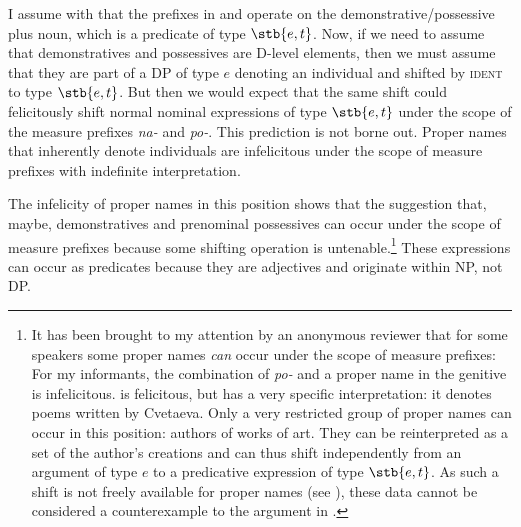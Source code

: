 \documentclass[output=paper]{langscibook}
\begin{document}
I assume with \citet{Filip2005} that the prefixes in  and  operate on the demonstrative/possessive plus noun, which is a predicate of type $\stb{e,t}$. Now, if we need to assume that demonstratives and possessives are D-level elements, then we must assume that they are part of a DP of type $e$ denoting an individual and shifted by \textsc{ident} to type $\stb{e,t}$. But then we would expect that the same shift could felicitously shift normal nominal expressions of type $\stb{e,t}$ under the scope of the measure prefixes \textit{na-} and \textit{po-}. This prediction is not borne out. Proper names that inherently denote individuals are infelicitous under the scope of measure prefixes with indefinite interpretation.


\ea\label{nasmotret} 
\z\z 

\noindent The infelicity of proper names in this position shows that the suggestion that, maybe, demonstratives and prenominal possessives can occur under the scope of measure prefixes because some shifting operation is untenable.\footnote{It has been brought to my attention by an anonymous reviewer that for some speakers some proper names \emph{can} occur under the scope of measure prefixes:
\ea
\z\z 
\noindent For my informants, the combination of \textit{po-} and a proper name in the genitive is infelicitous.  is felicitous, but has a very specific interpretation: it denotes poems written by Cvetaeva. Only a very restricted group of proper names can occur in this position: authors of works of art. They can be reinterpreted as a set of the author's creations and can thus shift independently from an argument of type $e$ to a predicative expression of type $\stb{e,t}$. As such a shift is not freely available for proper names (see ), these data cannot be considered a counterexample to the argument in .
}
These expressions can occur as predicates because they are adjectives and originate within NP, not DP.
\end{document}
